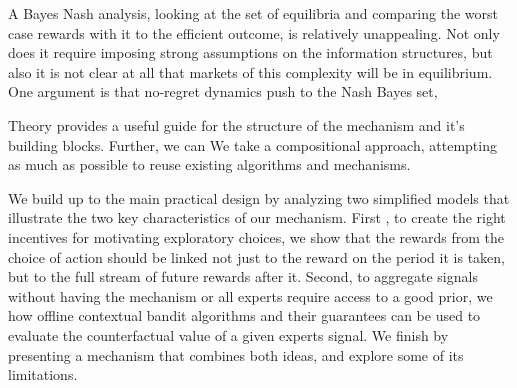A Bayes Nash analysis, looking at the set of equilibria and comparing the worst case rewards with it to the efficient outcome, is relatively unappealing. 
Not only does it require imposing strong assumptions on the information structures, but also it is not clear at all that markets of this complexity will be in equilibrium.
One argument is that no-regret dynamics push to the Nash Bayes set, 


Theory provides a useful guide for the structure of the mechanism and it's building blocks.
Further, we can 
We take a compositional approach, attempting as much as possible to reuse existing algorithms and mechanisms.



We build up to the main practical design by analyzing two simplified models that illustrate the two key characteristics of our mechanism. 
First , to create the right incentives for motivating exploratory choices, we show that the rewards from the choice of action should be linked not just to the reward on the period it is taken, but to the full stream of future rewards after it.
Second, to aggregate signals without having the mechanism or all  experts require access to a good prior, we how offline contextual bandit algorithms and their guarantees can be used to evaluate the counterfactual value of a given experts signal.
We finish by presenting a mechanism that combines both ideas, and explore some of its limitations.










